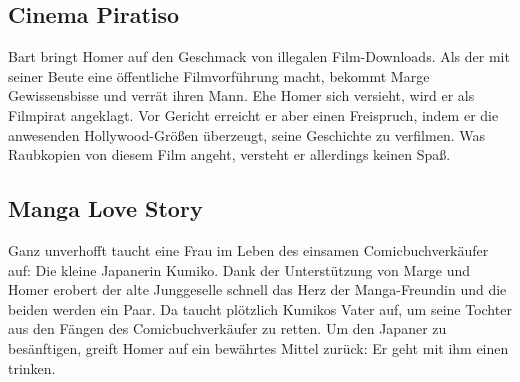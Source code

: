 \subsection{Cinema Piratiso}
Bart bringt Homer auf den Geschmack von illegalen Film-Downloads. Als der mit seiner Beute eine öffentliche Filmvorführung macht, bekommt Marge Gewissensbisse und verrät ihren Mann. Ehe Homer sich versieht, wird er als Filmpirat angeklagt. Vor Gericht erreicht er aber einen Freispruch, indem er die anwesenden Hollywood-Größen überzeugt, seine Geschichte zu verfilmen. Was Raubkopien von diesem Film angeht, versteht er allerdings keinen Spaß.



\subsection{Manga Love Story}\label{SABF03}
Ganz unverhofft taucht eine Frau im Leben des einsamen Comicbuchverkäufer auf: Die kleine Japanerin Kumiko. Dank der Unterstützung von Marge und Homer erobert der alte Junggeselle schnell das Herz der Manga-Freundin und die beiden werden ein Paar. Da taucht plötzlich Kumikos Vater auf, um seine Tochter aus den Fängen des Comicbuchverkäufer zu retten. Um den Japaner zu besänftigen, greift Homer auf ein bewährtes Mittel zurück: Er geht mit ihm einen trinken.


